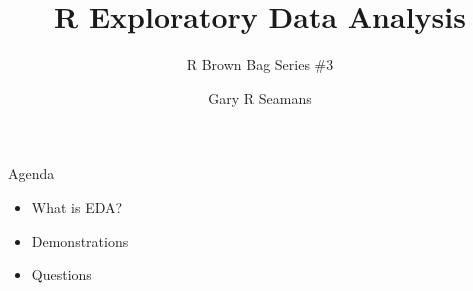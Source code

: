 \documentclass[11pt]{beamer}
\begin{document}
	\author{Gary R Seamans}
	\title{R Exploratory Data Analysis}
	\subtitle{R Brown Bag Series \#3}
	\begin{frame}[plain]
		\maketitle
    \end{frame}

\begin{frame}{
	\begin{minipage}[t]{0.55\textwidth}
		Agenda
	\end{minipage}
	\hfill
	\begin{minipage}[t]{0.35\textwidth}
		\flushright
	\end{minipage}
}{}
\begin{center}
	\begin{itemize}
		\item What is EDA?
		\item Demonstrations
		\item Questions
	\end{itemize}
\end{center}
\end{frame}
\end{document}
